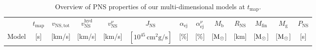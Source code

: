 \documentclass[fleqn,usenatbib]{mnras}
\newcommand{\solm}{\ensuremath{\rm{M_{\odot}}}\xspace}
\newcommand{\rns}{\ensuremath{R_{\mathrm{NS}}}\xspace}
\begin{document}
\begin{table}
\caption{Overview of PNS properties of our multi-dimensional models at $t_{\mathrm{map}}$.}
\label{tab:neutron star}
\begin{tabular}{cccccccccc||ccc}
    \hline 
            & $t_{\mathrm{map}}$ & 
            $v_{\mathrm{NS,tot}}$ & 
            $v_{\mathrm{NS}}^{\mathrm{hyd}}$ & 
            $v_{\mathrm{NS}}^{\nu}$ &
            $J_{\mathrm{NS}}$    & 
            $\alpha_{\mathrm{ej}}$&
            $\alpha_{\mathrm{ej}}^{\nu}$&
            $M_{\mathrm{b}}$ &
            \rns &
            $M_{\mathrm{fin}}$ &
            $M_{\mathrm{g}}$ &
            $P_{\mathrm{NS}}$ 
            \\
    Model &
    [s]   &
    [km/s] &
    [km/s] &
    [km/s] &
    $[10^{45}\, \mathrm{cm^2 g/s}]$ &
    [\%]              &  
    [\%]              &  
    [\solm]        &
    [km] &
    [\solm]         &
    [\solm]    &
    [s]     \\
    

\end{tabular}
\end{table}
\end{document}
